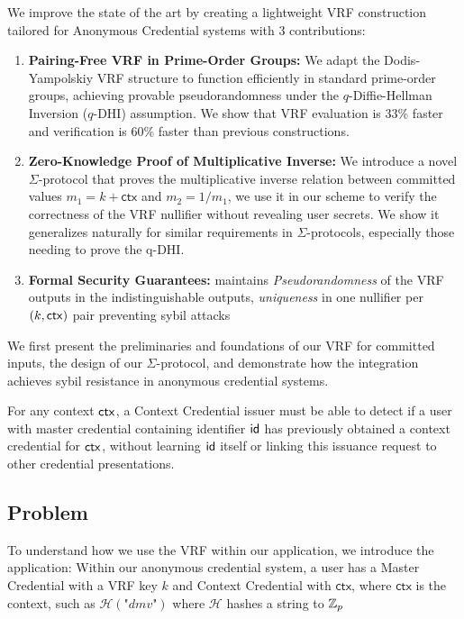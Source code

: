 \noindent We improve the state of the art by creating a lightweight VRF construction tailored for Anonymous Credential systems with 3 contributions:
\begin{enumerate}
        \item \textbf{Pairing-Free VRF in Prime-Order Groups:} We adapt the Dodis-Yampolskiy VRF structure to function efficiently in standard prime-order groups, achieving provable pseudorandomness under the $q$-Diffie-Hellman Inversion ($q$-DHI) assumption. We show that VRF evaluation is 33\% faster and verification is 60\% faster than previous constructions.

        \item \textbf{Zero-Knowledge Proof of Multiplicative Inverse:} We introduce a novel $\Sigma$-protocol that proves the multiplicative inverse relation between committed values $m_1 = k + \textsf{ctx}$ and $m_2 = 1/m_1$, we use it in our scheme to verify the correctness of the VRF nullifier without revealing user secrets. We show it generalizes naturally for similar requirements in $\Sigma$-protocols, especially those needing to prove the q-DHI.

         \item \textbf{Formal Security Guarantees:} maintains \emph{Pseudorandomness} of the VRF outputs in the indistinguishable outputs, \emph{uniqueness} in one nullifier per $(k, \mathsf{ctx})$ pair preventing sybil attacks

\end{enumerate}


We first present the preliminaries and foundations of our VRF for committed inputs, the design of our $\Sigma$-protocol, and demonstrate how the integration achieves sybil resistance in anonymous credential systems.

\begin{definition}
For any context $\mathsf{ctx}$, a Context Credential issuer must be able to detect if a user with master credential containing identifier $\mathsf{id}$ has previously obtained a context credential for $\mathsf{ctx}$, without learning $\mathsf{id}$ itself or linking this issuance request to other credential presentations.
\end{definition}

\subsection{Problem}
To understand how we use the VRF within our application, we introduce the application: 
Within our anonymous credential system, a user has a Master Credential with a VRF key $k$ and Context Credential with $\textsf{ctx}$, where $\textsf{ctx}$ is the context, such as $\mathcal{H}(\textit{"dmv"})$ where $\mathcal{H}$ hashes a string to $\mathbb{Z}_p$

